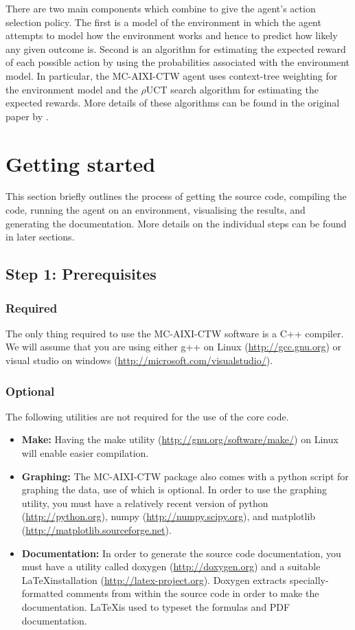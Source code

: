 \documentclass[a4paper,11pt]{article}
\begin{document}
There are two main components which combine to give the agent's action selection policy. The first is a model of the environment in which the agent attempts to model how the environment works and hence to predict how likely any given outcome is. Second is an algorithm for estimating the expected reward of each possible action by using the probabilities associated with the environment model. In particular, the MC-AIXI-CTW agent uses context-tree weighting for the environment model and the $\rho$UCT search algorithm for estimating the expected rewards. More details of these algorithms can be found in the original paper by \cite{Hutter:11aixictwx}.


\section{Getting started}
\label{sec:gettingstarted}
This section briefly outlines the process of getting the source code, compiling the code, running the agent on an environment, visualising the results, and generating the documentation. More details on the individual steps can be found in later sections.


\subsection{Step 1: Prerequisites}
\label{sec:prerequisites}

\subsubsection{Required}
The only thing required to use the MC-AIXI-CTW software is a C++ compiler. We will assume that you are using either g++ on Linux (\url{http://gcc.gnu.org}) or visual studio on windows (\url{http://microsoft.com/visualstudio/}).

\subsubsection{Optional}
The following utilities are not required for the use of the core code.
\begin{itemize}
\item {\bf Make:} Having the make utility (\url{http://gnu.org/software/make/}) on Linux will enable easier compilation.

\item {\bf Graphing:} The MC-AIXI-CTW package also comes with a python script for graphing the data, use of which is optional. In order to use the graphing utility, you must have a relatively recent version of python (\url{http://python.org}), numpy (\url{http://numpy.scipy.org}), and matplotlib (\url{http://matplotlib.sourceforge.net}). 

\item {\bf Documentation:} In order to generate the source code documentation, you must have a utility called doxygen (\url{http://doxygen.org}) and a suitable \LaTeX installation (\url{http://latex-project.org}). Doxygen extracts specially-formatted comments from within the source code in order to make the documentation. \LaTeX is used to typeset the formulas and PDF documentation.
\end{itemize}
\end{document}
